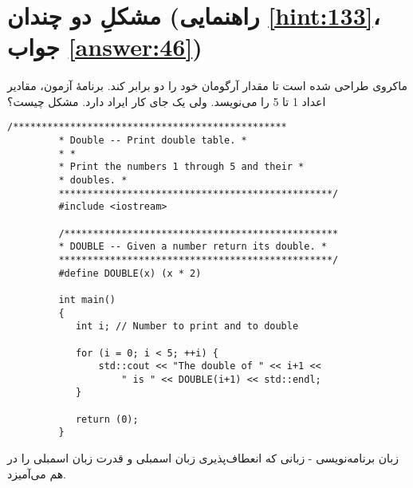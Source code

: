 \section[مشکلِ دو چندان]{مشکلِ دو چندان \protect{} (راهنمایی \ref{hint:133}، جواب \ref{answer:46})}
\paragraph{}\label{prog:76}
ماکروی  طراحی شده است تا مقدار آرگومان خود را دو برابر کند. برنامهٔ آزمون، مقادیر  اعداد 1 تا 5 را می‌نویسد. ولی یک جای کار ایراد دارد. مشکل چیست؟

\begin{LTR}
    \begin{lstlisting}[style=C++Style]
         /************************************************
         * Double -- Print double table. *
         * *
         * Print the numbers 1 through 5 and their *
         * doubles. *
         ************************************************/
         #include <iostream>

         /************************************************
         * DOUBLE -- Given a number return its double. *
         ************************************************/
         #define DOUBLE(x) (x * 2)

         int main()
         {
         	int i; // Number to print and to double

         	for (i = 0; i < 5; ++i) {
         		std::cout << "The double of " << i+1 <<
         			" is " << DOUBLE(i+1) << std::endl;
         	}

         	return (0);
         }
    \end{lstlisting}
\end{LTR}

\begin{tcolorbox}
    زبان برنامه‌نویسی  - زبانی که انعطاف‌پذیری زبان اسمبلی و قدرت زبان اسمبلی را در هم می‌آمیزد.
\end{tcolorbox}
